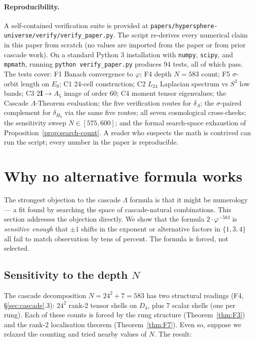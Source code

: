 \documentclass[11pt]{article}
\theoremstyle{plain}
\theoremstyle{definition}
\theoremstyle{remark}
\begin{document}
\paragraph{Reproducibility.} A self-contained verification suite is provided at \texttt{papers/hypersphere-universe/verify/verify\_paper.py}. The script re-derives every numerical claim in this paper from scratch (no values are imported from the paper or from prior cascade work). On a standard Python 3 installation with \texttt{numpy}, \texttt{scipy}, and \texttt{mpmath}, running \texttt{python verify\_paper.py} produces 94 tests, all of which pass. The tests cover: F1 Banach convergence to $\varphi$; F4 depth $N = 583$ count; F5 $\sigma$-orbit length on $E_8$; C1 24-cell construction; C2 $L_{24}$ Laplacian spectrum vs $S^3$ low bands; C3 $2\mathbf{I} \to A_5$ image of order 60; C4 moment tensor eigenvalues; the Cascade $\Lambda$-Theorem evaluation; the five verification routes for $\delta_\Lambda$; the $\sigma$-paired complement for $\delta_{H_0}$ via the same five routes; all seven cosmological cross-checks; the sensitivity sweep $N \in [575, 600]$; and the formal search-space exhaustion of Proposition~\ref{prop:search-count}. A reader who suspects the math is contrived can run the script; every number in the paper is reproducible.

\section{Why no alternative formula works}\label{sec:uniqueness}

The strongest objection to the cascade $\Lambda$ formula is that it might be numerology --- a fit found by searching the space of cascade-natural combinations. This section addresses the objection directly. We show that the formula $2 \cdot \varphi^{-583}$ is \emph{sensitive enough} that $\pm 1$ shifts in the exponent or alternative factors in $\{1, 3, 4\}$ all fail to match observation by tens of percent. The formula is forced, not selected.

\subsection{Sensitivity to the depth $N$}

The cascade decomposition $N = 24^2 + 7 = 583$ has two structural readings (F4, \S\ref{sec:cascade}.3): $24^2$ rank-2 tensor shells on $D_4$, plus 7 scalar shells (one per rung). Each of these counts is forced by the rung structure (Theorem~\ref{thm:F3}) and the rank-2 localisation theorem (Theorem~\ref{thm:F7}). Even so, suppose we relaxed the counting and tried nearby values of $N$. The result:
\end{document}
